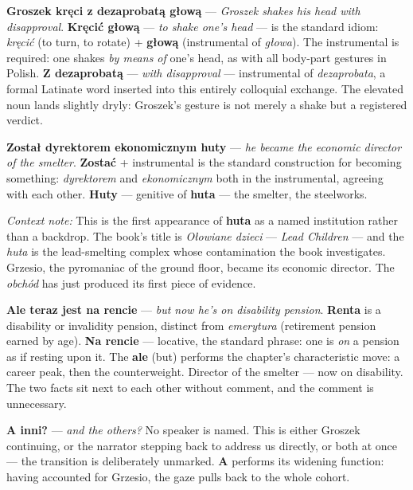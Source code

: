 \textbf{Groszek kręci z dezaprobatą głową} --- \textit{Groszek
shakes his head with disapproval}. \textbf{Kręcić głową} ---
\textit{to shake one's head} --- is the standard idiom:
\textit{kręcić} (to turn, to rotate) + \textbf{głową}
(instrumental of \textit{głowa}). The instrumental is
required: one shakes \textit{by means of} one's head, as
with all body-part gestures in Polish. \textbf{Z dezaprobatą}
--- \textit{with disapproval} --- instrumental of
\textit{dezaprobata}, a formal Latinate word inserted into
this entirely colloquial exchange. The elevated noun lands
slightly dryly: Groszek's gesture is not merely a shake
but a registered verdict.

\textbf{Został dyrektorem ekonomicznym huty} --- \textit{he
became the economic director of the smelter}.
\textbf{Zostać} + instrumental is the standard construction
for becoming something: \textit{dyrektorem} and
\textit{ekonomicznym} both in the instrumental, agreeing
with each other. \textbf{Huty} --- genitive of
\textbf{huta} --- the smelter, the steelworks.

\medskip
\noindent\textit{Context note:} This is the first appearance
of \textbf{huta} as a named institution rather than a backdrop.
The book's title is \textit{Ołowiane dzieci} --- \textit{Lead
Children} --- and the \textit{huta} is the lead-smelting
complex whose contamination the book investigates. Grzesio,
the pyromaniac of the ground floor, became its economic
director. The \textit{obchód} has just produced its first
piece of evidence.

\textbf{Ale teraz jest na rencie} --- \textit{but now he's
on disability pension}. \textbf{Renta} is a disability or
invalidity pension, distinct from \textit{emerytura}
(retirement pension earned by age). \textbf{Na rencie} ---
locative, the standard phrase: one is \textit{on} a pension
as if resting upon it. The \textbf{ale} (but) performs the
chapter's characteristic move: a career peak, then the
counterweight. Director of the smelter --- now on
disability. The two facts sit next to each other without
comment, and the comment is unnecessary.

\medskip

\textbf{A inni?} --- \textit{and the others?} No speaker
is named. This is either Groszek continuing, or the narrator
stepping back to address us directly, or both at once ---
the transition is deliberately unmarked. \textbf{A} performs
its widening function: having accounted for Grzesio, the
gaze pulls back to the whole cohort.

